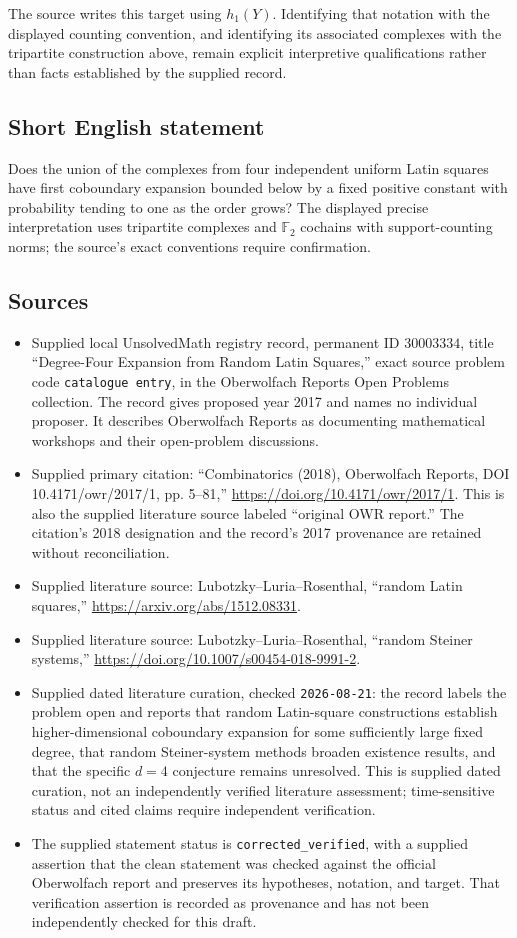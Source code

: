 \documentclass[11pt]{article}
\newcommand{\F}{\mathbb{F}}
\begin{document}
The source writes this target using \(h_1(Y)\). Identifying that notation with the displayed counting convention, and identifying its associated complexes with the tripartite construction above, remain explicit interpretive qualifications rather than facts established by the supplied record.
\subsection{Short English statement}
Does the union of the complexes from four independent uniform Latin squares have first coboundary expansion bounded below by a fixed positive constant with probability tending to one as the order grows? The displayed precise interpretation uses tripartite complexes and \(\F_2\) cochains with support-counting norms; the source's exact conventions require confirmation.
\subsection{Sources}
\begin{itemize}
\item Supplied local UnsolvedMath registry record, permanent ID \(30003334\), title ``Degree-Four Expansion from Random Latin Squares,'' exact source problem code \texttt{catalogue entry}, in the Oberwolfach Reports Open Problems collection. The record gives proposed year 2017 and names no individual proposer. It describes Oberwolfach Reports as documenting mathematical workshops and their open-problem discussions.
\item Supplied primary citation: ``Combinatorics (2018), Oberwolfach Reports, DOI 10.4171/owr/2017/1, pp. 5--81,'' \url{https://doi.org/10.4171/owr/2017/1}. This is also the supplied literature source labeled ``original OWR report.'' The citation's 2018 designation and the record's 2017 provenance are retained without reconciliation.
\item Supplied literature source: Lubotzky--Luria--Rosenthal, ``random Latin squares,'' \url{https://arxiv.org/abs/1512.08331}.
\item Supplied literature source: Lubotzky--Luria--Rosenthal, ``random Steiner systems,'' \url{https://doi.org/10.1007/s00454-018-9991-2}.
\item Supplied dated literature curation, checked \texttt{2026-08-21}: the record labels the problem open and reports that random Latin-square constructions establish higher-dimensional coboundary expansion for some sufficiently large fixed degree, that random Steiner-system methods broaden existence results, and that the specific \(d=4\) conjecture remains unresolved. This is supplied dated curation, not an independently verified literature assessment; time-sensitive status and cited claims require independent verification.
\item The supplied statement status is \texttt{corrected\_verified}, with a supplied assertion that the clean statement was checked against the official Oberwolfach report and preserves its hypotheses, notation, and target. That verification assertion is recorded as provenance and has not been independently checked for this draft.
\end{itemize}
\end{document}
